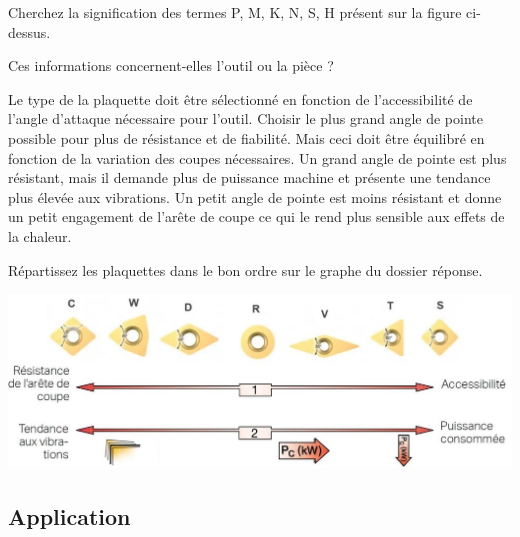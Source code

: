 \documentclass[12pt]{article}
\newcounter{exo}
\newenvironment{exo}{\stepcounter{exo}\vspace{0.5cm}{\bfseries Question \theexo\ :}}{\par\vspace{0.5cm}}
\begin{document}
\begin{exo} Cherchez la signification des termes P, M, K, N, S, H présent sur la figure ci-dessus. \end{exo}

\begin{exo} Ces informations concernent-elles l'outil ou la pièce ? \end{exo}






Le type de la plaquette doit être sélectionné en fonction de l'accessibilité de l'angle d'attaque nécessaire pour l'outil. Choisir le plus grand angle de pointe possible pour plus de résistance et de fiabilité. Mais ceci doit être équilibré en fonction de la variation des coupes nécessaires. Un grand angle de pointe est plus résistant, mais il demande plus de puissance machine et présente une tendance plus élevée aux vibrations. Un petit angle de pointe est moins résistant et donne un petit engagement de l'arête de coupe ce qui le rend plus sensible aux effets de la chaleur.

\begin{exo} Répartissez les plaquettes dans le bon ordre sur le graphe du dossier réponse. \end{exo}

\begin{center}
\includegraphics[width=0.9\linewidth]{Images/PLA22.JPG}
\end{center}


\subsection{Application}
\end{document}
